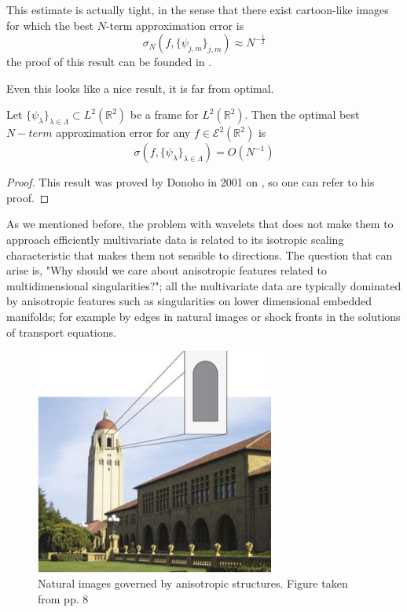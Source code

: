This estimate is actually tight, in the sense that there exist cartoon-like images for which the best $N$-term approximation error is
$$
\sigma_N(f,\{\psi_{j,m}\}_{j,m})\approx N^{-\frac{1}{2}}
$$
the proof of this result can be founded in \cite{Mallat}.

Even this looks like a nice result, it is far from optimal.

\bigskip

\begin{thm}
\label{C3S2T1}
Let $\{\psi_{\lambda}\}_{\lambda\in\Lambda}\subset L^2(\mathbb{R}^2)$ be a frame for $L^2(\mathbb{R}^2)$. Then the optimal best $N-term$ approximation error for any $f\in\mathcal{E}^2(\mathbb{R}^2)$ is
$$
\sigma(f,\{\psi_{\lambda}\}_{\lambda\in\Lambda})=O(N^{-1})
$$
\end{thm}
\begin{proof}
This result was proved by Donoho in 2001 on \cite{DonohobestNterm}, so one can refer to his proof.
\end{proof}

\bigskip

As we mentioned before, the problem with wavelets that does not make them to approach efficiently multivariate data is related to its isotropic scaling characteristic that makes them not sensible to directions. The question that can arise is, "Why should we care about anisotropic features related to multidimensional singularities?"; all the multivariate data are typically dominated by anisotropic features such as singularities on lower dimensional embedded manifolds; for example by edges in natural images or shock fronts in the solutions of transport equations. 

\begin{figure}[h!]
\centering
\includegraphics[width = 0.7\textwidth]{./Diagrams/edges-images.jpg}
\caption{Natural images governed by anisotropic structures. Figure taken from \cite{IntroShearlets} pp. 8}
\label{edges-images}
\end{figure}

